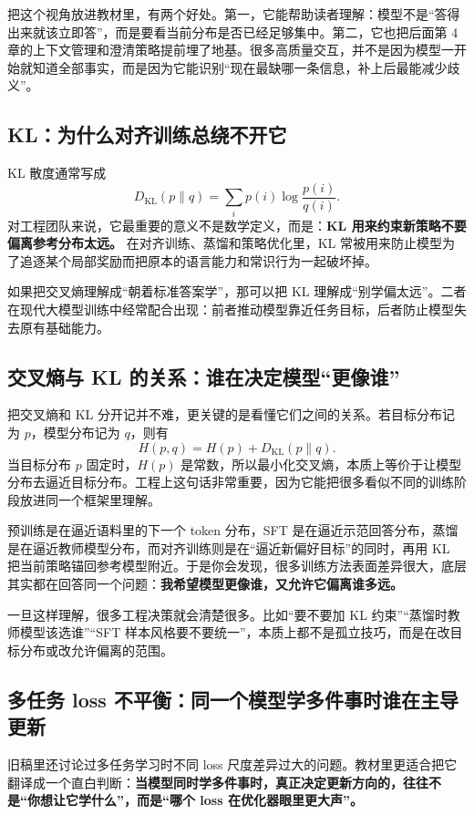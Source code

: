 把这个视角放进教材里，有两个好处。第一，它能帮助读者理解：模型不是“答得出来就该立即答”，而是要看当前分布是否已经足够集中。第二，它也把后面第 4 章的上下文管理和澄清策略提前埋了地基。很多高质量交互，并不是因为模型一开始就知道全部事实，而是因为它能识别“现在最缺哪一条信息，补上后最能减少歧义”。

\subsection{KL：为什么对齐训练总绕不开它}
KL 散度通常写成
\[
D_{\mathrm{KL}}(p\|q)=\sum_i p(i)\log\frac{p(i)}{q(i)}.
\]
对工程团队来说，它最重要的意义不是数学定义，而是：\textbf{KL 用来约束新策略不要偏离参考分布太远。} 在对齐训练、蒸馏和策略优化里，KL 常被用来防止模型为了追逐某个局部奖励而把原本的语言能力和常识行为一起破坏掉。

如果把交叉熵理解成“朝着标准答案学”，那可以把 KL 理解成“别学偏太远”。二者在现代大模型训练中经常配合出现：前者推动模型靠近任务目标，后者防止模型失去原有基础能力。

\subsection{交叉熵与 KL 的关系：谁在决定模型“更像谁”}
把交叉熵和 KL 分开记并不难，更关键的是看懂它们之间的关系。若目标分布记为 \(p\)，模型分布记为 \(q\)，则有
\[
H(p,q)=H(p)+D_{\mathrm{KL}}(p\|q).
\]
当目标分布 \(p\) 固定时，\(H(p)\) 是常数，所以最小化交叉熵，本质上等价于让模型分布去逼近目标分布。工程上这句话非常重要，因为它能把很多看似不同的训练阶段放进同一个框架里理解。

预训练是在逼近语料里的下一个 token 分布，SFT 是在逼近示范回答分布，蒸馏是在逼近教师模型分布，而对齐训练则是在“逼近新偏好目标”的同时，再用 KL 把当前策略锚回参考模型附近。于是你会发现，很多训练方法表面差异很大，底层其实都在回答同一个问题：\textbf{我希望模型更像谁，又允许它偏离谁多远。}

一旦这样理解，很多工程决策就会清楚很多。比如“要不要加 KL 约束”“蒸馏时教师模型该选谁”“SFT 样本风格要不要统一”，本质上都不是孤立技巧，而是在改目标分布或改允许偏离的范围。

\subsection{多任务 loss 不平衡：同一个模型学多件事时谁在主导更新}
旧稿里还讨论过多任务学习时不同 loss 尺度差异过大的问题。教材里更适合把它翻译成一个直白判断：\textbf{当模型同时学多件事时，真正决定更新方向的，往往不是“你想让它学什么”，而是“哪个 loss 在优化器眼里更大声”。}

